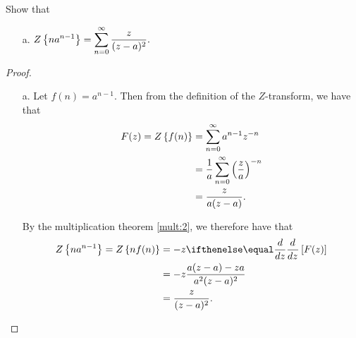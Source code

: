 \begin{problem}{12.5}
  Show that
  \begin{enumerate}
    \item[a.] $\displaystyle Z\left\{ {n a^{n-1}} \right\} = \sum_{n=0}^\infty \frac{z}{(z-a)^2}.$
  \end{enumerate}
\end{problem}

\begin{proof}
  \begin{enumerate}
    \item[a.] Let $f(n) = a^{n-1}$. Then from the definition of the $Z$-transform,
      we have that
      \begin{align*}
        F(z) = Z\left\{ {f(n)} \right\} &= \sum_{n=0}^\infty a^{n-1} z^{-n} \\
        &= \frac{1}{a}\sum_{n=0}^\infty \left(\frac{z}{a}\right)^{-n} \\
        &= \frac{z}{a(z-a)}.
      \end{align*}

      By the multiplication theorem \eqref{mult:2}, we
      therefore have that
      \begin{align*}
        \Z{n a^{n-1}} = \Z{n f(n)} &= -z \der{z}{}\left[F(z)\right]\\
        &= -z \frac{a(z-a) - za}{a^2(z-a)^2} \\
        &= \frac{z}{(z-a)^2}.
      \end{align*}
  \end{enumerate}
\end{proof}
\newpage
